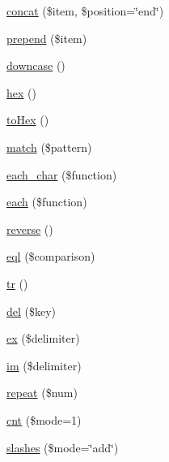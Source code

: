 \begin{DoxyCompactItemize}
\item 
\hyperlink{class_pierce_moore_1_1_ruby_p_h_p_1_1r_a69c3762d52c367c08ca4dd234f5576df}{concat} (\$item, \$position=\char`\"{}end\char`\"{})
\item 
\hyperlink{class_pierce_moore_1_1_ruby_p_h_p_1_1r_a7e2ed8a2b96e8c0340390647f081557c}{prepend} (\$item)
\item 
\hyperlink{class_pierce_moore_1_1_ruby_p_h_p_1_1r_ac627a4ea49a87091d67dd7e1319bc872}{downcase} ()
\item 
\hyperlink{class_pierce_moore_1_1_ruby_p_h_p_1_1r_a0c6f82bc490087648b9f1fef553e05eb}{hex} ()
\item 
\hyperlink{class_pierce_moore_1_1_ruby_p_h_p_1_1r_a59e26fcd3f578f30737550623859abe7}{to\-Hex} ()
\item 
\hyperlink{class_pierce_moore_1_1_ruby_p_h_p_1_1r_a59c310be108326e741acb1a678ff9bbe}{match} (\$pattern)
\item 
\hyperlink{class_pierce_moore_1_1_ruby_p_h_p_1_1r_a52486765aad19321ca30127f786ca709}{each\-\_\-char} (\$function)
\item 
\hyperlink{class_pierce_moore_1_1_ruby_p_h_p_1_1r_a6c0a4c47b3531bcc641e0aa02e155f00}{each} (\$function)
\item 
\hyperlink{class_pierce_moore_1_1_ruby_p_h_p_1_1r_a601c54a2a4082e5d8dfc4509b07ea958}{reverse} ()
\item 
\hyperlink{class_pierce_moore_1_1_ruby_p_h_p_1_1r_a3a9f9703b0a2b7a455a1e109f96f706d}{eql} (\$comparison)
\item 
\hyperlink{class_pierce_moore_1_1_ruby_p_h_p_1_1r_a93130ece3f9aced2dcacf00ec6968413}{tr} ()
\item 
\hyperlink{class_pierce_moore_1_1_ruby_p_h_p_1_1r_a4be48cfb26bfde30df2a0954ee852591}{del} (\$key)
\item 
\hyperlink{class_pierce_moore_1_1_ruby_p_h_p_1_1r_ae05789292fafbb86600f74343762296c}{ex} (\$delimiter)
\item 
\hyperlink{class_pierce_moore_1_1_ruby_p_h_p_1_1r_acb799c47bea88bda888622f887871c1c}{im} (\$delimiter)
\item 
\hyperlink{class_pierce_moore_1_1_ruby_p_h_p_1_1r_ab924f20be77fca419f8433a2c8df810a}{repeat} (\$num)
\item 
\hyperlink{class_pierce_moore_1_1_ruby_p_h_p_1_1r_ad8ade07cf9fec6dddec76822547a34b2}{cnt} (\$mode=1)
\item 
\hyperlink{class_pierce_moore_1_1_ruby_p_h_p_1_1r_aee99d6b6d0c3479c48a98e76de963e06}{slashes} (\$mode=\char`\"{}add\char`\"{})
\item 

\end{DoxyCompactItemize}
